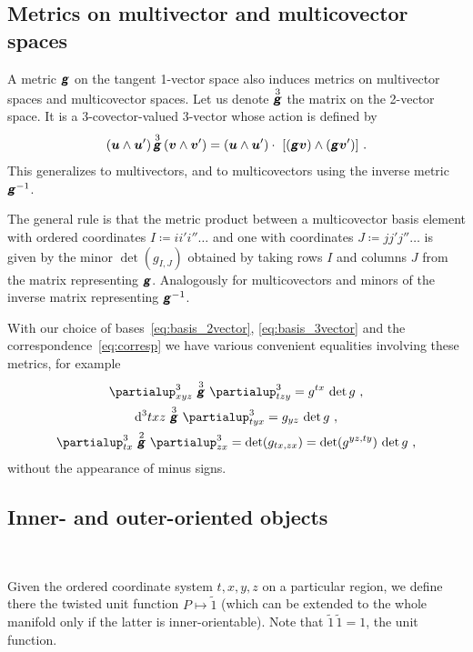 \documentclass[\ifafour a4paper,12pt,\else a5paper,10pt,\fi%
onecolumn,oneside,article,%
british%
]{memoir}
\theoremstyle{remark}
\theoremstyle{innote}
\newcommand*{\mathte}[1]{\textbf{\textit{\textsf{#1}}}}
\newcommand*{\wrench}{{\fontencoding{U}\fontfamily{fontawesomethree}\selectfont\symbol{114}}}
\newcommand{\mynotew}[1]{{\footnotesize\color{notecolour}\wrench\ #1}}
\newcommand*{\de}{\partialup}%
\newcommand*{\di}{\mathrm{d}}%
\newcommand*{\defd}{\coloneqq}
\renewcommand*{\|}[1][]{\nonscript\:#1\vert\nonscript\:\mathopen{}}
\newcommand*{\yg}{\mathte{g}}
\newcommand*{\ddi}[2][]{\di^{#1}#2}
\newcommand*{\dde}[2][]{\de^{#1}_{#2}}
\begin{document}
\subsection{Metrics on multivector and multicovector spaces}
\label{sec:metrics_multivec}

A metric $\yg$ on the tangent 1-vector space also induces metrics on multivector spaces and multicovector spaces. Let us denote $\overset{3}{\yg}$ the matrix on the 2-vector space. It is a 3-covector-valued 3-vector whose action is defined by
\begin{equation}
  \label{eq:G2_example}
  (\bm{u}\land\bm{u}')\, \overset{3}{\yg}\, (\bm{v}\land\bm{v}') =
  (\bm{u}\land\bm{u}') \cdot\  [(\yg\bm{v})\land(\yg\bm{v}')] \ .
\end{equation}
This generalizes to multivectors, and to multicovectors using the inverse metric $\yg^{-1}$.

The general rule is that the metric product between a multicovector basis element with ordered coordinates $I \defd ii'i''\dotso$ and one with coordinates $J \defd jj'j''\dotso$ is given by the minor $\det(g_{I,J})$ obtained by taking rows $I$ and columns $J$ from the matrix representing $\yg$. Analogously for multicovectors and minors of the inverse matrix representing $\yg^{-1}$.

With our choice of bases~\eqref{eq:basis_2vector}, \eqref{eq:basis_3vector} and the correspondence~\eqref{eq:corresp} we have various convenient equalities involving these metrics, for example
\begin{equation}
  \label{eq:example_metric_3vector}
  \begin{gathered}
    \dde[3]{xyz}\ \overset{3}{\yg}\ \dde[3]{tzy} =  g^{tx}\, \det g\ , \\
    \ddi[3]{txz}\ \overset{3}{\yg}\ \dde[3]{tyx} =  g_{yz}\, \det g\ , \\
    \dde[3]{tx}\ \overset{2}{\yg}\ \dde[3]{zx} =
\det(g_{tx,zx}) =  \det(g^{yz,ty})\, \det g\ , 
\end{gathered}
\end{equation}
without the appearance of minus signs.

\subsection{Inner- and outer-oriented objects}
\label{sec:outer-or_obj}

\mynotew{}

Given the ordered coordinate system $t,x,y,z$ on a particular region, we define there the twisted unit function $P \mapsto \tilde{1}$ (which can be extended to the whole manifold only if the latter is inner-orientable). Note that $\tilde{1}\, \tilde{1} = 1$, the unit function.
\end{document}

